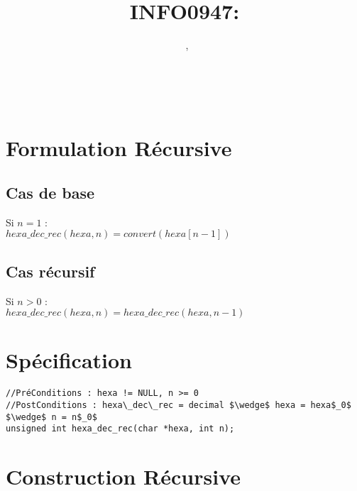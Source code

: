 \documentclass[a4paper, 11pt, oneside]{article}
\title{INFO0947: \intitule}
\author{\textsc{\Prenom}~\textsc{\Nom}, \matricule}
\date{}
\newcommand{\tablemat}{~}
\begin{document}
\maketitle
\newpage
\tablemat
\newpage


\section{Formulation Récursive}\label{formulation}
%
%

\subsection{Cas de base}

Si $n = 1$ :\\

$hexa\_dec\_rec(hexa, n) = convert(hexa[n - 1])$\\

\subsection{Cas récursif}

Si $n > 0$ :\\

$hexa\_dec\_rec(hexa, n) = hexa\_dec\_rec(hexa, n - 1)$\\

\section{Spécification}\label{specification}
%
%

\begin{lstlisting}
//PréConditions : hexa != NULL, n >= 0
//PostConditions : hexa\_dec\_rec = decimal $\wedge$ hexa = hexa$_0$ $\wedge$ n = n$_0$
unsigned int hexa_dec_rec(char *hexa, int n);
\end{lstlisting}

\section{Construction Récursive}\label{recur}
%
%
\end{document}
